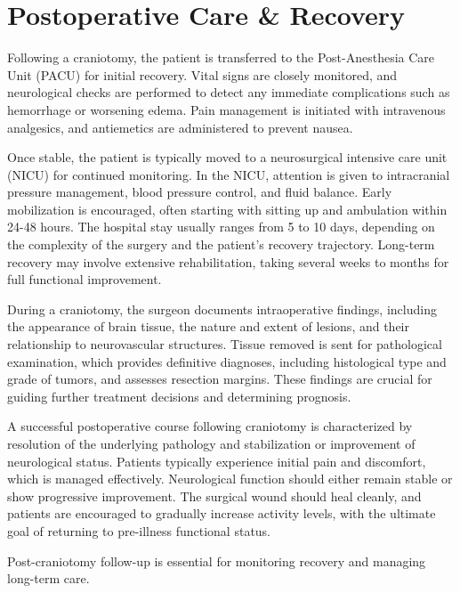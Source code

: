 \section*{Postoperative Care \& Recovery}
Following a craniotomy, the patient is transferred to the Post-Anesthesia Care Unit (PACU) for initial recovery. Vital signs are closely monitored, and neurological checks are performed to detect any immediate complications such as hemorrhage or worsening edema. Pain management is initiated with intravenous analgesics, and antiemetics are administered to prevent nausea.

Once stable, the patient is typically moved to a neurosurgical intensive care unit (NICU) for continued monitoring. In the NICU, attention is given to intracranial pressure management, blood pressure control, and fluid balance. Early mobilization is encouraged, often starting with sitting up and ambulation within 24-48 hours. The hospital stay usually ranges from 5 to 10 days, depending on the complexity of the surgery and the patient's recovery trajectory. Long-term recovery may involve extensive rehabilitation, taking several weeks to months for full functional improvement.

During a craniotomy, the surgeon documents intraoperative findings, including the appearance of brain tissue, the nature and extent of lesions, and their relationship to neurovascular structures. Tissue removed is sent for pathological examination, which provides definitive diagnoses, including histological type and grade of tumors, and assesses resection margins. These findings are crucial for guiding further treatment decisions and determining prognosis.

A successful postoperative course following craniotomy is characterized by resolution of the underlying pathology and stabilization or improvement of neurological status. Patients typically experience initial pain and discomfort, which is managed effectively. Neurological function should either remain stable or show progressive improvement. The surgical wound should heal cleanly, and patients are encouraged to gradually increase activity levels, with the ultimate goal of returning to pre-illness functional status.

Post-craniotomy follow-up is essential for monitoring recovery and managing long-term care.

